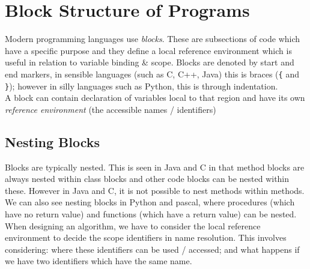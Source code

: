 \section{Block Structure of Programs}
Modern programming languages use \textit{blocks}. These are subsections of code which have a specific purpose and they define a local reference environment which is useful in relation to variable binding \& scope. Blocks are denoted by start and end markers, in sensible languages (such as C, C++, Java) this is braces (\verb|{| and \verb|}|); however in silly languages such as Python, this is through indentation. \\

A block can contain declaration of variables local to that region and have its own \textit{reference environment} (the accessible names / identifiers)

\subsection{Nesting Blocks}
Blocks are typically nested. This is seen in Java and C in that method blocks are always nested within class blocks and other code blocks can be nested within these. However in Java and C, it is not possible to nest methods within methods. We can also see nesting blocks in Python and pascal, where procedures (which have no return value) and functions (which have a return value) can be nested.\\

When designing an algorithm, we have to consider the local reference environment to decide the scope identifiers in name resolution. This involves considering: where these identifiers can be used / accessed; and what happens if we have two identifiers which have the same name.


